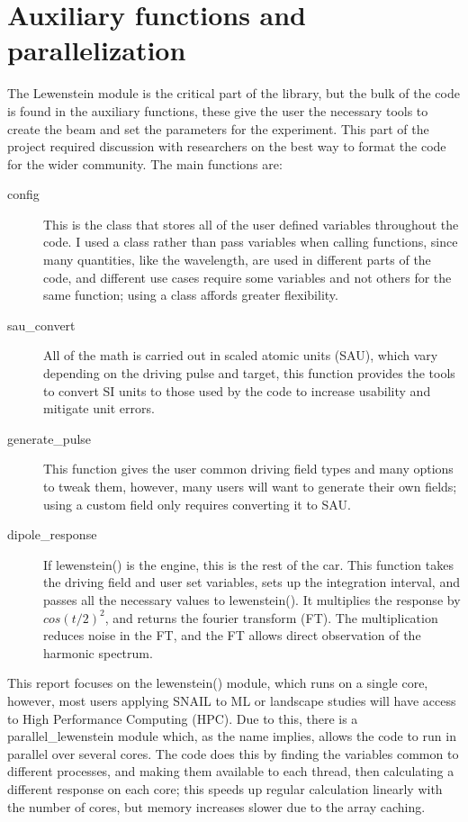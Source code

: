 \documentclass[11pt,a4paper]{report}
\begin{document}
\section{Auxiliary functions and parallelization}
The Lewenstein module is the critical part of the library, but the bulk of the code is found in the auxiliary functions, these give the user the necessary tools to create the beam and set the parameters for the experiment. This part of the project required discussion with researchers on the best way to format the code for the wider community. The main functions are:
\begin{description}
\item[config] This is the class that stores all of the user defined variables throughout the code. I used a class rather than pass variables when calling functions, since many quantities, like the wavelength, are used in different parts of the code, and different use cases require some variables and not others for the same function; using a class affords greater flexibility.
\item[sau\_convert] All of the math is carried out in scaled atomic units (SAU), which vary depending on the driving pulse and target, this function provides the tools to convert SI units to those used by the code to increase usability and mitigate unit errors.
\item[generate\_pulse] This function gives the user common driving field types and many options to tweak them, however, many users will want to generate their own fields; using a custom field only requires converting it to SAU.
\item[dipole\_response] If lewenstein() is the engine, this is the rest of the car. This function takes the driving field and user set variables, sets up the integration interval, and passes all the necessary values to lewenstein(). It multiplies the response by $cos(t/2)^2$, and returns the fourier transform (FT). The multiplication reduces noise in the FT, and the FT allows direct observation of the harmonic spectrum.
\end{description}

This report focuses on the lewenstein() module, which runs on a single core, however, most users applying SNAIL to ML or landscape studies will have access to High Performance Computing (HPC). Due to this, there is a parallel\_lewenstein module which, as the name implies, allows the code to run in parallel over several cores. The code does this by finding the variables common to different processes, and making them available to each thread, then calculating a different response on each core; this speeds up regular calculation linearly with the number of cores, but memory increases slower due to the array caching.
\end{document}
